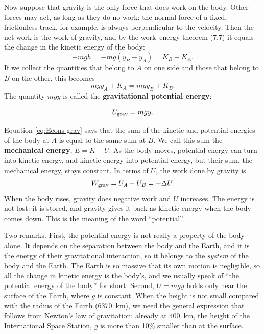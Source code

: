 \documentclass[11pt,a4paper]{article}
\begin{document}
Now suppose that gravity is the only force that does work on the body. Other forces may act, as
long as they do no work: the normal force of a fixed, frictionless track, for example, is always
perpendicular to the velocity. Then the net work is the work of gravity, and by the work--energy
theorem \textup{(7.7)} it equals the change in the kinetic energy of the body:
\begin{equation}\label{eq:wet-grav}
  -mgh = -mg(y_B - y_A) = K_B - K_A .
\end{equation}
If we collect the quantities that belong to $A$ on one side and those that belong to $B$ on the
other, this becomes
\begin{equation}\label{eq:Econs-grav}
  mgy_A + K_A = mgy_B + K_B .
\end{equation}
The quantity $mgy$ is called the \textbf{gravitational potential energy}:
\begin{keyresult}
\begin{equation}\label{eq:Ugrav}
  U_{\mathrm{grav}} = mgy .
\end{equation}
\end{keyresult}
Equation \eqref{eq:Econs-grav} says that the sum of the kinetic and potential energies of the body
at $A$ is equal to the same sum at $B$. We call this sum the \textbf{mechanical energy},
$E = K + U$. As the body moves, potential energy can turn into kinetic energy, and kinetic energy
into potential energy, but their sum, the mechanical energy, stays constant. In terms of $U$, the
work done by gravity is
\[
  W_{\mathrm{grav}} = U_A - U_B = -\Delta U .
\]
When the body rises, gravity does negative work and $U$ increases. The energy is not lost: it is
stored, and gravity gives it back as kinetic energy when the body comes down. This is the meaning of
the word ``potential''.

Two remarks. First, the potential energy is not really a property of the body alone. It depends on
the separation between the body and the Earth, and it is the energy of their gravitational
interaction, so it belongs to the \emph{system} of the body and the Earth. The Earth is so massive
that its own motion is negligible, so all the change in kinetic energy is the body's, and we
usually speak of ``the potential energy of the body'' for short. Second, $U = mgy$ holds only near
the surface of the Earth, where $g$ is constant. When the height is not small compared with the
radius of the Earth (\qty{6370}{km}), we need the general expression that follows from Newton's law
of gravitation: already at \qty{400}{km}, the height of the International Space Station, $g$ is
more than 10\% smaller than at the surface.
\end{document}
